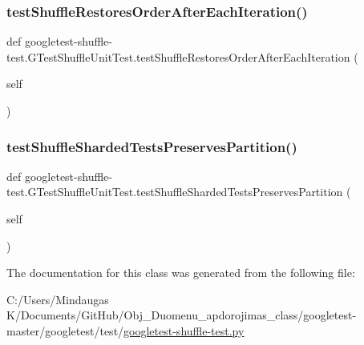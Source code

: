 \subsubsection{\texorpdfstring{testShuffleRestoresOrderAfterEachIteration()}{testShuffleRestoresOrderAfterEachIteration()}}
{\footnotesize\ttfamily def googletest-\/shuffle-\/test.\+G\+Test\+Shuffle\+Unit\+Test.\+test\+Shuffle\+Restores\+Order\+After\+Each\+Iteration (\begin{DoxyParamCaption}\item[{}]{self }\end{DoxyParamCaption})}

\mbox{\label{classgoogletest-shuffle-test_1_1_g_test_shuffle_unit_test_a9e21814173c0822718d74c79c10e3b21}} 
\subsubsection{\texorpdfstring{testShuffleShardedTestsPreservesPartition()}{testShuffleShardedTestsPreservesPartition()}}
{\footnotesize\ttfamily def googletest-\/shuffle-\/test.\+G\+Test\+Shuffle\+Unit\+Test.\+test\+Shuffle\+Sharded\+Tests\+Preserves\+Partition (\begin{DoxyParamCaption}\item[{}]{self }\end{DoxyParamCaption})}



The documentation for this class was generated from the following file\+:\begin{DoxyCompactItemize}
\item 
C\+:/\+Users/\+Mindaugas K/\+Documents/\+Git\+Hub/\+Obj\+\_\+\+Duomenu\+\_\+apdorojimas\+\_\+class/googletest-\/master/googletest/test/\mbox{\hyperlink{googletest-master_2googletest_2test_2googletest-shuffle-test_8py}{googletest-\/shuffle-\/test.\+py}}\end{DoxyCompactItemize}
